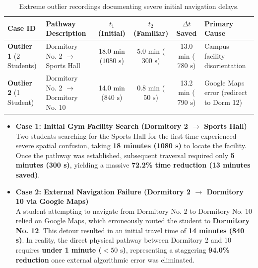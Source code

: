 \documentclass[11pt, a4paper]{article}
\begin{document}
\begin{table}[h!]
\centering
\small
\begin{tabular}{p{2.5cm} p{4.2cm} c c c p{2.2cm}}
\toprule
\textbf{Case ID} & \textbf{Pathway Description} & \textbf{$t_1$ (Initial)} & \textbf{$t_2$ (Familiar)} & \textbf{$\Delta t$ Saved} & \textbf{Primary Cause} \\
\midrule
\textbf{Outlier 1} \newline (2 Students) & Dormitory No. 2 $\rightarrow$ Sports Hall & 18.0 min \newline ($1080\text{ s}$) & 5.0 min \newline ($300\text{ s}$) & 13.0 min \newline ($780\text{ s}$) & Campus facility disorientation \\
\midrule
\textbf{Outlier 2} \newline (1 Student) & Dormitory No. 2 $\rightarrow$ Dormitory No. 10 & 14.0 min \newline ($840\text{ s}$) & 0.8 min \newline ($50\text{ s}$) & 13.2 min \newline ($790\text{ s}$) & Google Maps error (redirect to Dorm 12) \\
\bottomrule
\end{tabular}
\caption{Extreme outlier recordings documenting severe initial navigation delays.}
\end{table}

\vspace{0.5em}

\begin{tcolorbox}[colframe=accent, title=Detailed Case Breakdown: Extreme Outliers]
\begin{itemize}
    \item \textbf{Case 1: Initial Gym Facility Search (Dormitory 2 $\rightarrow$ Sports Hall)} \\
    Two students searching for the Sports Hall for the first time experienced severe spatial confusion, taking \textbf{18 minutes (1080 s)} to locate the facility. Once the pathway was established, subsequent traversal required only \textbf{5 minutes (300 s)}, yielding a massive \textbf{72.2\% time reduction (13 minutes saved)}.
    \item \textbf{Case 2: External Navigation Failure (Dormitory 2 $\rightarrow$ Dormitory 10 via Google Maps)} \\
    A student attempting to navigate from Dormitory No. 2 to Dormitory No. 10 relied on Google Maps, which erroneously routed the student to \textbf{Dormitory No. 12}. This detour resulted in an initial travel time of \textbf{14 minutes (840 s)}. In reality, the direct physical pathway between Dormitory 2 and 10 requires \textbf{under 1 minute ($<50\text{ s}$)}, representing a staggering \textbf{94.0\% reduction} once external algorithmic error was eliminated.
\end{itemize}
\end{tcolorbox}
\end{document}
